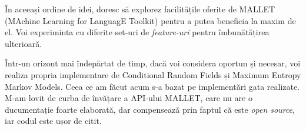 În aceeași ordine de idei, doresc să explorez facilitățile oferite de MALLET (MAchine Learning for LanguagE Toolkit) pentru a putea beneficia la maxim de el. Voi experiminta cu diferite set-uri de \textit{feature-uri} pentru îmbunătățirea ulterioară.

Într-un orizont mai îndepărtat de timp, dacă voi considera oportun și necesar, voi realiza propria implementare de Conditional Random Fields și Maximum Entropy Markov Models. Ceea ce am făcut acum s-a bazat pe implementări gata realizate. M-am lovit de curba de învățare a API-ului MALLET, care nu are o ducumentație foarte elaborată, dar compensează prin faptul că este \textit{open source}, iar codul este ușor de citit.




